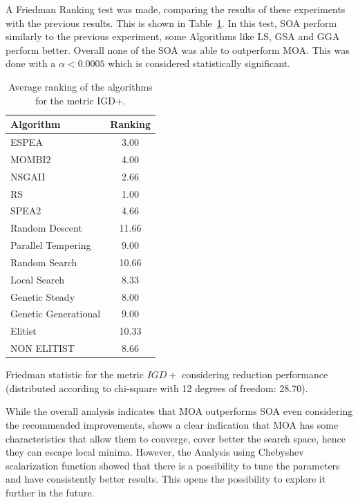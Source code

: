 A Friedman Ranking test was made, comparing the results of these experiments with the previous results. This is shown in Table~\ref{tab:fried_che_igd}. In this test, SOA perform similarly to the previous experiment, some Algorithms like LS, GSA and GGA perform better. Overall none of the SOA was able to outperform MOA. This was done with a $\alpha < 0.0005$ which is considered statistically significant. 


\begin{table}[H]
    \centering
    \begin{threeparttable}
    \begin{tabular}{lc}
    \hline
    Algorithm&Ranking\\
    \hline
    ESPEA&3.00\\
    MOMBI2&4.00\\
    NSGAII&2.66\\
    RS&1.00\\
    SPEA2&4.66\\
    Random Descent&11.66\\
    Parallel Tempering&9.00\\
    Random Search&10.66\\
    Local Search&8.33\\
    Genetic Steady&8.00\\
    Genetic Generational&9.00\\
    Elitist&10.33\\
    NON ELITIST&8.66\\
    \hline
    \end{tabular}
    \begin{tablenotes}
        \small
        \item Friedman statistic for the metric $IGD+$ considering reduction performance (distributed according to chi-square with 12 degrees of freedom: 28.70).\\
        \end{tablenotes}
    \end{threeparttable}
    \caption{Average ranking of the algorithms for the metric IGD+.}
    \label{tab:fried_che_igd}
\end{table}

While the overall analysis indicates that MOA outperforms SOA even considering the recommended improvements, shows a clear indication that MOA has some characteristics that allow them to converge, cover better the search space, hence they can escape local minima. However, the Analysis using Chebyshev scalarization function showed that there is a possibility to tune the parameters and have consistently better results. This opens the possibility to explore it further in the future.

